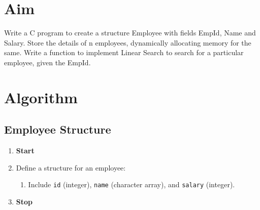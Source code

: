 
\section{Aim}
Write a C program to create a structure Employee with fields EmpId, Name and Salary. Store
the details of n employees, dynamically allocating memory for the same. Write a function to
implement Linear Search to search for a particular employee, given the EmpId.

\section{Algorithm}
 {\selectfont

  \subsection{Employee Structure}
  \begin{enumerate}[label=\arabic*:,left=0pt]
    \item \textbf{Start}
    \item Define a structure for an employee:
          \begin{enumerate}[label=2.\arabic*.]
            \item Include \texttt{id} (integer), \texttt{name} (character array), and \texttt{salary} (integer).
          \end{enumerate}
    \item \textbf{Stop}
  \end{enumerate}

}
